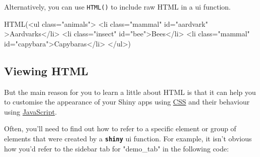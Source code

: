 \documentclass[
  oneside]{book}
\newenvironment{Shaded}{\begin{snugshade}}{\end{snugshade}}
\newcommand{\AttributeTok}[1]{\textcolor[rgb]{0.77,0.63,0.00}{#1}}
\newcommand{\FunctionTok}[1]{\textcolor[rgb]{0.00,0.00,0.00}{#1}}
\newcommand{\NormalTok}[1]{#1}
\newcommand{\SpecialCharTok}[1]{\textcolor[rgb]{0.00,0.00,0.00}{#1}}
\newcommand{\StringTok}[1]{\textcolor[rgb]{0.31,0.60,0.02}{#1}}
\begin{document}
\begin{Shaded}
\end{Shaded}

Alternatively, you can use \texttt{HTML}\texttt{()} to include raw HTML in a ui function.

\begin{Shaded}
\begin{Highlighting}[]
\FunctionTok{HTML}\NormalTok{(}\StringTok{\textquotesingle{}\textless{}ul class="animals"\textgreater{}}
\StringTok{    \textless{}li class="mammal" id="aardvark" \textgreater{}Aardvarks\textless{}/li\textgreater{}}
\StringTok{    \textless{}li class="insect" id="bee"\textgreater{}Bees\textless{}/li\textgreater{}}
\StringTok{    \textless{}li class="mammal" id="capybara"\textgreater{}Capybaras\textless{}/li\textgreater{}}
\StringTok{\textless{}/ul\textgreater{}\textquotesingle{}}\NormalTok{)}
\end{Highlighting}
\end{Shaded}

\hypertarget{viewing-html}{%
\subsection{Viewing HTML}\label{viewing-html}}

But the main reason for you to learn a little about HTML is that it can help you to customise the appearance of your Shiny apps using \protect\hyperlink{CSS}{CSS} and their behaviour using \protect\hyperlink{JavaScript}{JavaScript}.

Often, you'll need to find out how to refer to a specific element or group of elements that were created by a \textbf{\texttt{shiny}} ui function. For example, it isn't obvious how you'd refer to the sidebar tab for \StringTok{"demo\_tab"} in the following code:
\end{document}
